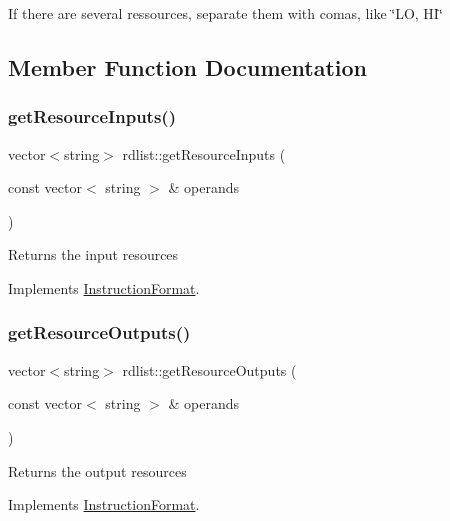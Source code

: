 If there are several ressources, separate them with comas, like \char`\"{}\+L\+O, H\+I\char`\"{} 

\subsection{Member Function Documentation}
\mbox{\label{classrdlist_a6323881f795a77f99a05cdbea09f3a8b}} 
\subsubsection{\texorpdfstring{get\+Resource\+Inputs()}{getResourceInputs()}}
{\footnotesize\ttfamily vector$<$string$>$ rdlist\+::get\+Resource\+Inputs (\begin{DoxyParamCaption}\item[{const vector$<$ string $>$ \&}]{operands }\end{DoxyParamCaption})\hspace{0.3cm}{\ttfamily [virtual]}}

Returns the input resources 

Implements \hyperlink{classInstructionFormat_a09775d3a3c22f40a0f44504664e586e4}{Instruction\+Format}.

\mbox{\label{classrdlist_a5757c02c361945639b7c5f11f93a5e37}} 
\subsubsection{\texorpdfstring{get\+Resource\+Outputs()}{getResourceOutputs()}}
{\footnotesize\ttfamily vector$<$string$>$ rdlist\+::get\+Resource\+Outputs (\begin{DoxyParamCaption}\item[{const vector$<$ string $>$ \&}]{operands }\end{DoxyParamCaption})\hspace{0.3cm}{\ttfamily [virtual]}}

Returns the output resources 

Implements \hyperlink{classInstructionFormat_a95cd28ffb1bde59b67f676880ab10536}{Instruction\+Format}.

\mbox{\label{classrdlist_a14fd300b1148e07a48853f79cc8bdb2a}} 
